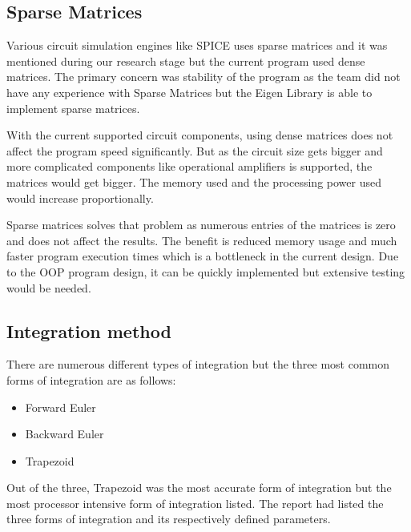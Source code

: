 \documentclass[12pt,a4paper]{article}
\begin{document}
\subsection{Sparse Matrices}
Various circuit simulation engines like SPICE uses sparse matrices and it was mentioned \cite{OOP} during our research stage but 
the current program used dense matrices. The primary concern was stability of the program as the team did not have 
any experience with Sparse Matrices but the Eigen Library is able to implement sparse matrices. \par
With the current supported circuit components, using dense matrices does not affect the program speed significantly. But as 
the circuit size gets bigger and more complicated components like operational amplifiers is supported, the matrices would
get bigger. The memory used and the processing power used would increase proportionally. \par
Sparse matrices solves that problem as numerous entries of the matrices is zero and does not affect the results. The benefit is
reduced memory usage and much faster program execution times which is a bottleneck in the current design.
Due to the OOP program design, it can be quickly implemented but extensive testing would be needed.
\subsection{Integration method}
There are numerous different types of integration but the three most common forms of integration are as follows:
\begin{itemize}
	\item Forward Euler
	\item Backward Euler
	\item Trapezoid
\end{itemize}
\pagebreak
Out of the three, Trapezoid was the most accurate form of integration but the most processor intensive form of integration listed.
The report had listed the three forms of integration and its respectively defined parameters. 
\end{document}
